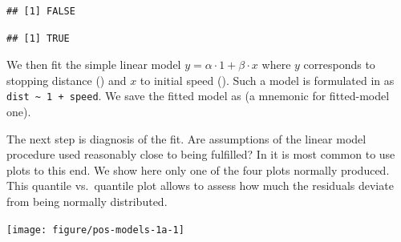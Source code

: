 \documentclass[krantz2]{krantz}\usepackage{knitr}%
\begin{document}
\begin{knitrout}\footnotesize
{}\color{fgcolor}\begin{kframe}
\begin{alltt}
\hlopt{$}
\end{alltt}
\begin{verbatim}
## [1] FALSE
\end{verbatim}
\begin{alltt}
\hlopt{$}
\end{alltt}
\begin{verbatim}
## [1] TRUE
\end{verbatim}
\end{kframe}
\end{knitrout}

We then fit the simple linear model $y = \alpha \cdot 1 + \beta \cdot x$ where $y$ corresponds to stopping distance () and $x$ to initial speed (). Such a model is formulated in \Rlang as \verb|dist ~ 1 + speed|. We save the fitted model as  (a mnemonic for fitted-model one).

\begin{knitrout}\footnotesize
{}\color{fgcolor}\begin{kframe}
\begin{alltt}
 \hlkwb{<-}  \hlopt{~}  \hlopt{+}  
\end{alltt}
\end{kframe}
\end{knitrout}

The next step is diagnosis of the fit. Are assumptions of the linear model procedure used reasonably close to being fulfilled? In \Rlang it is most common to use plots to this end. We show here only one of the four plots normally produced. This quantile vs.\ quantile plot allows to assess how much the residuals deviate from being normally distributed.

\begin{knitrout}\footnotesize
{}\color{fgcolor}\begin{kframe}
\begin{alltt}
  \hlstd{=} \hlstd{)}
\end{alltt}
\end{kframe}

{\centering \texttt{[image: figure/pos-models-1a-1]} 

}



\end{knitrout}
\end{document}

